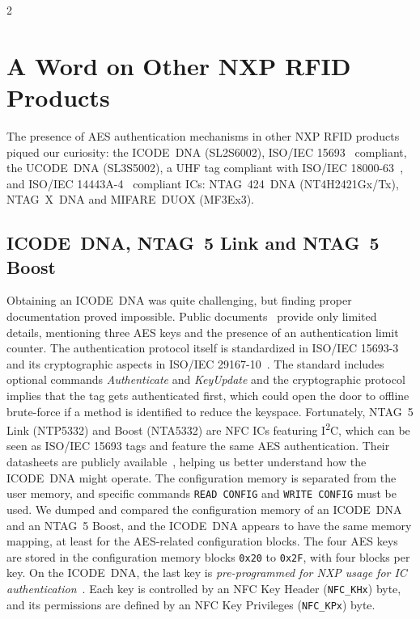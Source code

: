 \documentclass[10pt,letterpaper]{article}
\begin{document}
\begin{multicols}{2}
\section{A Word on Other NXP RFID Products}
\label{sec:othertechs}
The presence of AES authentication mechanisms in other NXP RFID products piqued our curiosity: the ICODE~DNA (SL2S6002), ISO/IEC 15693~\cite{iso_15693_3} compliant, the UCODE~DNA (SL3S5002), a UHF tag compliant with ISO/IEC 18000-63~\cite{iso_18000_63}, and ISO/IEC 14443A-4~\cite{iso_14443_4} compliant ICs: NTAG~424~DNA (NT4H2421Gx/Tx), NTAG~X~DNA and MIFARE~DUOX (MF3Ex3).

\subsection{ICODE~DNA, NTAG~5 Link and NTAG~5 Boost}
\label{sec:icode}
Obtaining an ICODE~DNA was quite challenging, but finding proper documentation proved impossible. Public documents~\cite{sl2S6002_3r0_2016,nxp_an11809} provide only limited details, mentioning three AES keys and the presence of an authentication limit counter.
The authentication protocol itself is standardized in ISO/IEC 15693-3~\cite{iso_15693_3} and its cryptographic aspects in ISO/IEC 29167-10~\cite{iso_29167_10}.
The standard includes optional commands \emph{Authenticate} and \emph{KeyUpdate} and the cryptographic protocol implies that the tag gets authenticated first, which could open the door to offline brute-force if a method is identified to reduce the keyspace.
Fortunately, NTAG~5 Link (NTP5332) and Boost (NTA5332) are NFC ICs featuring I\textsuperscript{2}C, which can be seen as ISO/IEC 15693 tags and feature the same AES authentication. Their datasheets are publicly available~\cite{ntp53x2_3r3_2020,nta5332_3r3_2020}, helping us better understand how the ICODE~DNA might operate.
The configuration memory is separated from the user memory, and specific commands \texttt{READ CONFIG} and \texttt{WRITE CONFIG} must be used.
We dumped and compared the configuration memory of an ICODE~DNA and an NTAG~5 Boost, and the ICODE~DNA appears to have the same memory mapping, at least for the AES-related configuration blocks.
The four AES keys are stored in the configuration memory blocks \texttt{0x20} to \texttt{0x2F}, with four blocks per key. On the ICODE~DNA, the last key is \emph{pre-programmed for NXP usage for IC authentication}~\cite{sl2S6002_3r0_2016}. 
Each key is controlled by an NFC Key Header (\texttt{NFC\_KHx}) byte, and its permissions are defined by an NFC Key Privileges (\texttt{NFC\_KPx}) byte.

\end{multicols}
\end{document}
